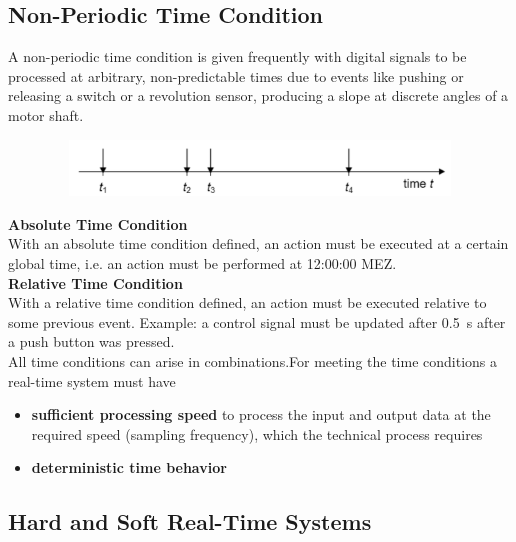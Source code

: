 \subsection{Non-Periodic Time Condition}

A non-periodic time condition is given frequently with digital signals to be processed at arbitrary, non-predictable times due to events like pushing or releasing a switch or a revolution sensor, producing a slope at discrete angles of a motor shaft.\\

	\begin{figure}[h]
    \centering
    \includegraphics[width=12cm, height=1.5cm]{Images/image67.png}
    \label{fig:Fig 13}
    \end{figure}

\textbf{Absolute Time Condition }\\
With an absolute time condition defined, an action must be executed at a certain global time, i.e. an action must be performed at 12:00:00 MEZ.\\

\textbf{Relative Time Condition }\\
With a relative time condition defined, an action must be executed relative to some previous event. Example: a control signal must be updated after 0.5~s after a push button was pressed.\\

All time conditions can arise in combinations.For meeting the time conditions a real-time system must have

\begin{itemize}
	\item  \textbf{sufficient processing speed} to process the input and output data at the required speed (sampling frequency), which the technical process requires
	\item  \textbf{deterministic time behavior}
\end{itemize}

\subsection{Hard and Soft Real-Time Systems}

